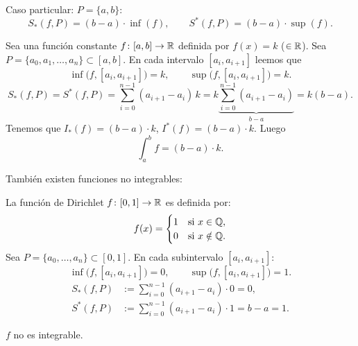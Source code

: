 \documentclass[11pt,a4paper]{article}
\begin{document}
Caso particular: $P=\{a,b\}$:
\[
  S_*(f,P)=(b-a)\cdot\inf(f),\qquad S^*(f,P)=(b-a)\cdot\sup(f).
\]

\begin{ejemplo}
Sea una función constante $f\colon[a,b]\to\mathbb{R}$ definida por $f(x)=k$ ($\in\mathbb{R}$).
Sea $P=\{a_0,a_1,\dots,a_n\}\subset[a,b]$. En cada intervalo $[a_i,a_{i+1}]$ leemos que
\[
  \inf\bigl(f,[a_i,a_{i+1}]\bigr)=k,\qquad \sup\bigl(f,[a_i,a_{i+1}]\bigr)=k.
\]
\[
  S_*(f,P)=S^*(f,P)=\sum_{i=0}^{n-1}(a_{i+1}-a_i)\,k
  = k\underbrace{\sum_{i=0}^{n-1}(a_{i+1}-a_i)}_{b-a}=k(b-a).
\]
Tenemos que $I_*(f)=(b-a)\cdot k$, $I^*(f)=(b-a)\cdot k$. Luego
\[
  \int_a^b f=(b-a)\cdot k.
\]
\end{ejemplo}

También existen funciones no integrables:

\begin{ejemplo}
La función de Dirichlet $f\colon[0,1]\to\mathbb{R}$ es definida por:
\[
  f(x)=\begin{cases}1 & \text{si } x\in\mathbb{Q},\\ 0 & \text{si } x\notin\mathbb{Q}.\end{cases}
\]
Sea $P=\{a_0,\dots,a_n\}\subset[0,1]$. En cada subintervalo $[a_i,a_{i+1}]$:
\[
  \inf\bigl(f,[a_i,a_{i+1}]\bigr)=0,\qquad \sup\bigl(f,[a_i,a_{i+1}]\bigr)=1.
\]
\begin{align*}
  S_*(f,P) &:= \sum_{i=0}^{n-1}(a_{i+1}-a_i)\cdot 0=0,\\
  S^*(f,P) &:= \sum_{i=0}^{n-1}(a_{i+1}-a_i)\cdot 1=b-a=1.
\end{align*}
\begin{center}
\end{center}
$f$ no es integrable.
\end{ejemplo}
\end{document}
